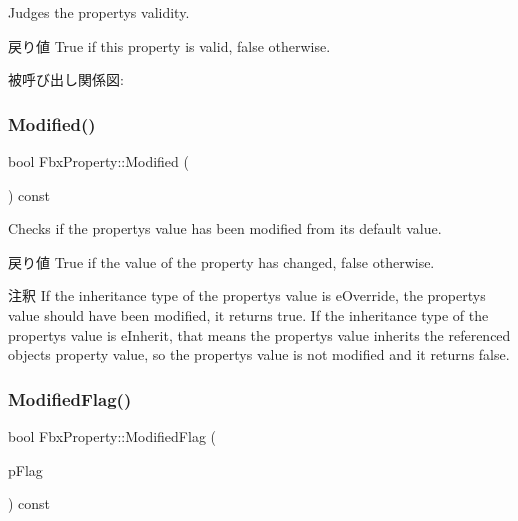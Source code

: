 Judges the property\textquotesingle{}s validity. \begin{DoxyReturn}{戻り値}
{\ttfamily True} if this property is valid, {\ttfamily false} otherwise. 
\end{DoxyReturn}
被呼び出し関係図\+:
\mbox{\label{class_fbx_property_acea8ef5412320c293dfaca9680bc797b}} 
\subsubsection{\texorpdfstring{Modified()}{Modified()}}
{\footnotesize\ttfamily bool Fbx\+Property\+::\+Modified (\begin{DoxyParamCaption}{ }\end{DoxyParamCaption}) const}

Checks if the property\textquotesingle{}s value has been modified from its default value. \begin{DoxyReturn}{戻り値}
{\ttfamily True} if the value of the property has changed, {\ttfamily false} otherwise. 
\end{DoxyReturn}
\begin{DoxyRemark}{注釈}
If the inheritance type of the property\textquotesingle{}s value is e\+Override, the property\textquotesingle{}s value should have been modified, it returns {\ttfamily true}. If the inheritance type of the property\textquotesingle{}s value is e\+Inherit, that means the property\textquotesingle{}s value inherits the referenced object\textquotesingle{}s property value, so the property\textquotesingle{}s value is not modified and it returns {\ttfamily false}. 
\end{DoxyRemark}
\mbox{\label{class_fbx_property_ab89605d755ba9030d8a03819741dbafb}} 
\subsubsection{\texorpdfstring{Modified\+Flag()}{ModifiedFlag()}}
{\footnotesize\ttfamily bool Fbx\+Property\+::\+Modified\+Flag (\begin{DoxyParamCaption}\item[{\hyperlink{class_fbx_property_flags_afabfa7e0949aac8a7dcdf8a141867e99}{Fbx\+Property\+Flags\+::\+E\+Flags}}]{p\+Flag }\end{DoxyParamCaption}) const}

